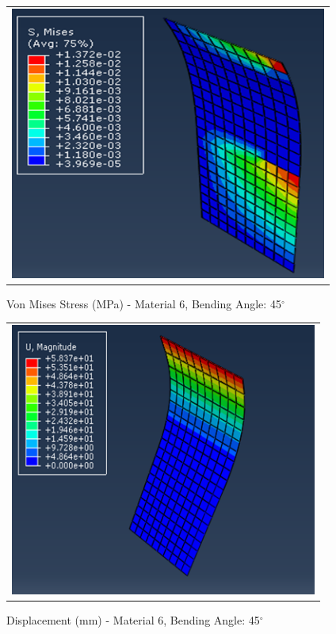 \documentclass[a4paper,12pt]{article}
\numberwithin{equation}{section}
\numberwithin{figure}{section}
\begin{document}
\begin{figure}[H]
  \centering
  \begin{tabular}{@{}c@{}}
    \includegraphics[width=0.7\linewidth,height=255pt]{Results/Bending/M6_VMS_45_new.png} \\
  \end{tabular}
  \caption{Von Mises Stress (MPa) - Material 6,  Bending Angle: 45$^{\circ}$ }
\end{figure}

\begin{figure}[H]
  \centering
  \begin{tabular}{@{}c@{}}
    \includegraphics[width=0.7\linewidth,height=255pt]{Results/Bending/M6_DIS_45_new.png} \\
  \end{tabular}
  \caption{Displacement (mm) - Material 6, Bending Angle: 45$^{\circ}$ }
\end{figure}
\end{document}

